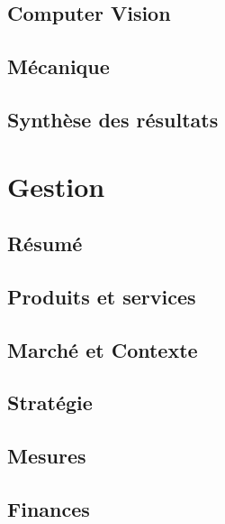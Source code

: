 \documentclass[11pt,titlepage]{report}
\begin{document}
\chapter{Computer Vision}




\chapter{Mécanique}


\chapter{Synthèse des résultats}


\part{Gestion}

\chapter{Résumé}


\chapter{Produits et services}


\chapter{Marché et Contexte}


\chapter{Stratégie}


\chapter{Mesures}


\chapter{Finances}

\end{document}

